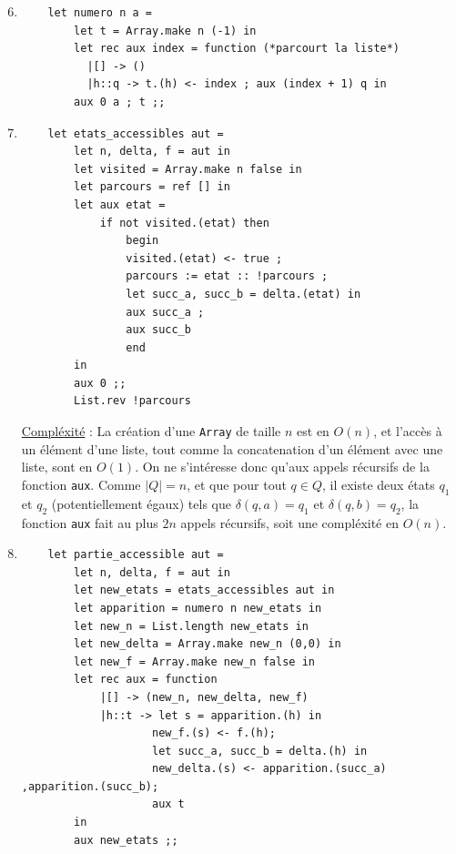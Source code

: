 \documentclass{article}
\begin{document}
\begin{enumerate}
    \setcounter{enumi}{5}

    \item \begin{verbatim}
    let numero n a =
        let t = Array.make n (-1) in
        let rec aux index = function (*parcourt la liste*)
          |[] -> ()
          |h::q -> t.(h) <- index ; aux (index + 1) q in
        aux 0 a ; t ;;
    \end{verbatim}

    \item \begin{verbatim}
    let etats_accessibles aut = 
        let n, delta, f = aut in 
        let visited = Array.make n false in
        let parcours = ref [] in
        let aux etat =
            if not visited.(etat) then 
                begin
                visited.(etat) <- true ;
                parcours := etat :: !parcours ;
                let succ_a, succ_b = delta.(etat) in
                aux succ_a ;
                aux succ_b
                end 
        in 
        aux 0 ;;
        List.rev !parcours
    \end{verbatim}
    \underline{Compl\'exit\'e} : La création d'une \verb|Array| de taille $n$ est en $O(n)$, et l'accès à un élément d'une liste, tout comme la concatenation d'un élément avec une liste, sont en $O(1)$. On ne s'intéresse donc qu'aux appels récursifs de la fonction \verb|aux|. Comme $|Q| = n$, et que pour tout $q \in Q$, il existe deux \'etats $q_1$ et $q_2$ (potentiellement égaux) tels que $\delta(q, a) = q_1$ et $\delta(q, b) = q_2$, la fonction \verb|aux| fait au plus $2n$ appels récursifs, soit une compléxité en $\boxed{O(n)}$.

    \item \begin{verbatim}
    let partie_accessible aut = 
        let n, delta, f = aut in
        let new_etats = etats_accessibles aut in 
        let apparition = numero n new_etats in
        let new_n = List.length new_etats in
        let new_delta = Array.make new_n (0,0) in
        let new_f = Array.make new_n false in
        let rec aux = function
            |[] -> (new_n, new_delta, new_f)
            |h::t -> let s = apparition.(h) in
                    new_f.(s) <- f.(h);
                    let succ_a, succ_b = delta.(h) in
                    new_delta.(s) <- apparition.(succ_a) ,apparition.(succ_b);
                    aux t 
        in
        aux new_etats ;;
    \end{verbatim}

\end{enumerate}
\end{document}
